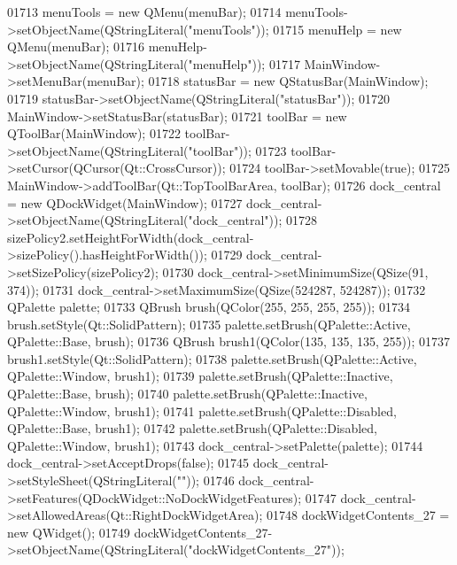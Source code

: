 \begin{DoxyCode}
01713         menuTools = \textcolor{keyword}{new} QMenu(menuBar);
01714         menuTools->setObjectName(QStringLiteral(\textcolor{stringliteral}{"menuTools"}));
01715         menuHelp = \textcolor{keyword}{new} QMenu(menuBar);
01716         menuHelp->setObjectName(QStringLiteral(\textcolor{stringliteral}{"menuHelp"}));
01717         MainWindow->setMenuBar(menuBar);
01718         statusBar = \textcolor{keyword}{new} QStatusBar(MainWindow);
01719         statusBar->setObjectName(QStringLiteral(\textcolor{stringliteral}{"statusBar"}));
01720         MainWindow->setStatusBar(statusBar);
01721         toolBar = \textcolor{keyword}{new} QToolBar(MainWindow);
01722         toolBar->setObjectName(QStringLiteral(\textcolor{stringliteral}{"toolBar"}));
01723         toolBar->setCursor(QCursor(Qt::CrossCursor));
01724         toolBar->setMovable(\textcolor{keyword}{true});
01725         MainWindow->addToolBar(Qt::TopToolBarArea, toolBar);
01726         dock\_central = \textcolor{keyword}{new} QDockWidget(MainWindow);
01727         dock\_central->setObjectName(QStringLiteral(\textcolor{stringliteral}{"dock\_central"}));
01728         sizePolicy2.setHeightForWidth(dock\_central->sizePolicy().hasHeightForWidth());
01729         dock\_central->setSizePolicy(sizePolicy2);
01730         dock\_central->setMinimumSize(QSize(91, 374));
01731         dock\_central->setMaximumSize(QSize(524287, 524287));
01732         QPalette palette;
01733         QBrush brush(QColor(255, 255, 255, 255));
01734         brush.setStyle(Qt::SolidPattern);
01735         palette.setBrush(QPalette::Active, QPalette::Base, brush);
01736         QBrush brush1(QColor(135, 135, 135, 255));
01737         brush1.setStyle(Qt::SolidPattern);
01738         palette.setBrush(QPalette::Active, QPalette::Window, brush1);
01739         palette.setBrush(QPalette::Inactive, QPalette::Base, brush);
01740         palette.setBrush(QPalette::Inactive, QPalette::Window, brush1);
01741         palette.setBrush(QPalette::Disabled, QPalette::Base, brush1);
01742         palette.setBrush(QPalette::Disabled, QPalette::Window, brush1);
01743         dock\_central->setPalette(palette);
01744         dock\_central->setAcceptDrops(\textcolor{keyword}{false});
01745         dock\_central->setStyleSheet(QStringLiteral(\textcolor{stringliteral}{""}));
01746         dock\_central->setFeatures(QDockWidget::NoDockWidgetFeatures);
01747         dock\_central->setAllowedAreas(Qt::RightDockWidgetArea);
01748         dockWidgetContents\_27 = \textcolor{keyword}{new} QWidget();
01749         dockWidgetContents\_27->setObjectName(QStringLiteral(\textcolor{stringliteral}{"dockWidgetContents\_27"}));

\end{DoxyCode}

